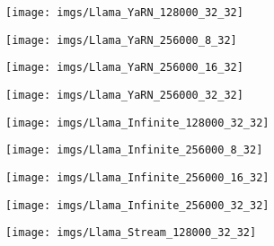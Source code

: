 \begin{figure*}[ht]
	\begin{minipage}{\textwidth}
		\centering
		\begin{minipage}{0.24\textwidth}
			\centering
			\texttt{[image: imgs/Llama\_YaRN\_128000\_32\_32]} %
		\end{minipage}%
		\begin{minipage}{0.24\textwidth}
			\centering
			\texttt{[image: imgs/Llama\_YaRN\_256000\_8\_32]} %
		\end{minipage}%
		\begin{minipage}{0.24\textwidth}
			\centering
			\texttt{[image: imgs/Llama\_YaRN\_256000\_16\_32]} %
		\end{minipage}%
		\begin{minipage}{0.24\textwidth}
			\centering
			\texttt{[image: imgs/Llama\_YaRN\_256000\_32\_32]} %
		\end{minipage}
	\end{minipage}
	\begin{minipage}{\textwidth}
		\centering
		\begin{minipage}{0.24\textwidth}
			\centering
			\texttt{[image: imgs/Llama\_Infinite\_128000\_32\_32]} %
		\end{minipage}%
		\begin{minipage}{0.24\textwidth}
			\centering
			\texttt{[image: imgs/Llama\_Infinite\_256000\_8\_32]} %
		\end{minipage}%
		\begin{minipage}{0.24\textwidth}
			\centering
			\texttt{[image: imgs/Llama\_Infinite\_256000\_16\_32]} %
		\end{minipage}%
		\begin{minipage}{0.24\textwidth}
			\centering
			\texttt{[image: imgs/Llama\_Infinite\_256000\_32\_32]} %
		\end{minipage}
	\end{minipage}
	\begin{minipage}{\textwidth}
		\centering
		\begin{minipage}{0.24\textwidth}
			\centering
			\texttt{[image: imgs/Llama\_Stream\_128000\_32\_32]} %

\end{minipage}
\end{minipage}
\end{figure*}
